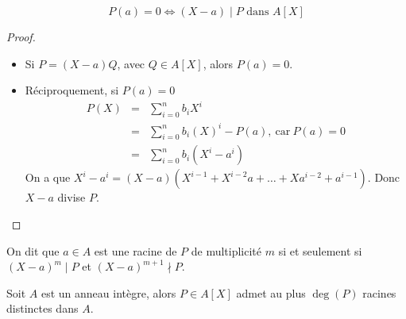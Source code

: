 \begin{prop}
	$$ P(a) = 0 \iff (X-a) \mid P \text{ dans } A[X]$$
\end{prop}

\begin{proof}
	\begin{itemize}
		\item Si $P = (X-a)Q$, avec $Q \in A[X]$, alors $P(a) = 0$.
		\item Réciproquement, si $P(a) = 0$
		      \begin{eqnarray*}
			      P(X) &=& \sum_{i=0}^n b_iX^i \\
			      &=& \sum_{i=0}^n b_i(X)^i  - P(a), \ \text{car}  \ P(a) = 0 \\
			      &=& \sum_{i=0}^n b_i(X^i-a^i)
		      \end{eqnarray*}
		      On a que $X^i - a^i = (X-a)(X^{i-1} + X^{i-2}a + \dots + Xa^{i-2} + a^{i-1})$. %
		      Donc $X-a$ divise $P$.
	\end{itemize}
\end{proof}

\begin{definition}
	On dit que $a \in A$ est une racine de $P$ de multiplicité $m$ si et seulement si $(X-a)^m \mid P$ et $(X-a)^{m+1} \nmid P$.
\end{definition}

\begin{prop}
	Soit $A$ est un anneau intègre, alors $P \in A[X]$ admet au plus $\deg(P)$ racines distinctes dans $A$.
\end{prop}

